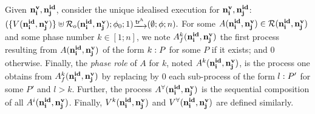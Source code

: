 \begin{definition}
\label{def:phaseRoles}
Given ${\mathbf{n^{v}_{i}}},{\mathbf{n^{id}_{j}}}$, consider the unique idealised execution for ${\mathbf{n^{v}_{i}}},{\mathbf{n^{id}_{j}}}$:
$(\{V(\nID{i},\nV{j})\}\uplus\roles_o(\nID{i},\nV{j});\phi_0;1) \sint{\tr^h}
(\emptyset;\phi;n).$
For some $A({\mathbf{n^{id}_{i}}},{\mathbf{n^{v}_{j}}})\in\mathcal{R}({\mathbf{n^{id}_{i}}},{\mathbf{n^{v}_{j}}})$ and some phase number $k\in[1;n]$,
we note $A^k_f({\mathbf{n^{id}_{i}}},{\mathbf{n^{v}_{j}}})$ the first process resulting from $A({\mathbf{n^{id}_{i}}},{\mathbf{n^{v}_{j}}})$ of the form
$k: P$ for some $P$ if it exists; and $0$ otherwise.
Finally, the {\em phase role} of $A$ for $k$, noted $A^k({\mathbf{n^{id}_{i}}},{\mathbf{n^{v}_{j}}})$, is the process one obtains from
$A^k_f({\mathbf{n^{id}_{i}}},{\mathbf{n^{v}_{j}}})$ by replacing by $0$ each sub-process of the form $l: P'$ for some $P'$ and $l> k$.
Further, the process $A^{\forall}({\mathbf{n^{id}_{i}}},{\mathbf{n^{v}_{j}}})$ is the sequential composition of all $A^i({\mathbf{n^{id}_{i}}},{\mathbf{n^{v}_{j}}})$.
Finally, $V^k({\mathbf{n^{id}_{i}}},{\mathbf{n^{v}_{j}}})$ and $V^{\forall}({\mathbf{n^{id}_{i}}},{\mathbf{n^{v}_{j}}})$ 
are defined similarly.
\end{definition}


